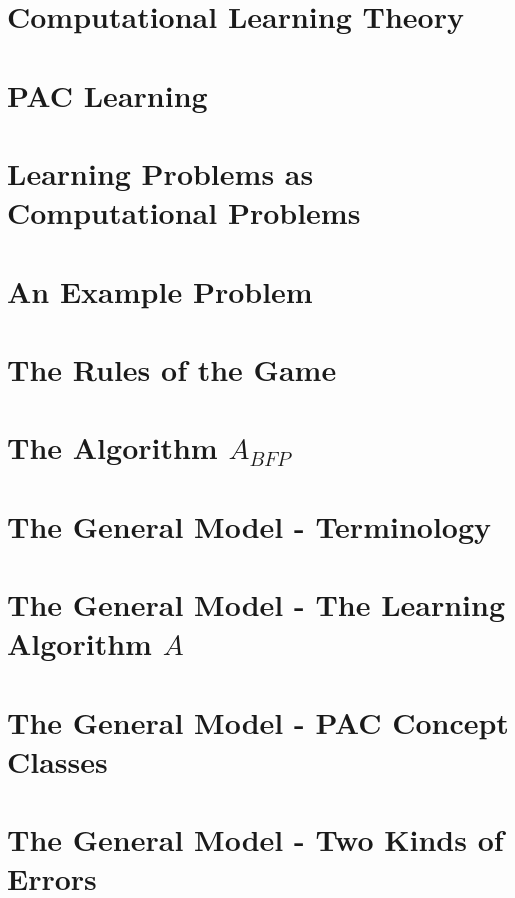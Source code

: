 \documentclass[12pt,a4paper,oneside]{book}
\begin{document}
\section{Computational Learning Theory}

\label{s_5_1}

\section{PAC Learning}

\label{s_5_2}

\section{Learning Problems as Computational Problems}

\label{s_5_3}

\section{An Example Problem}

\label{s_5_4}

\section{The Rules of the Game}

\label{s_5_5}

\section{The Algorithm \texorpdfstring{$A_{BFP}$}{ABFP}}

\label{s_5_6}

\section{The General Model - Terminology}

\label{s_5_7}

\section{The General Model - The Learning Algorithm \texorpdfstring{$A$}{A}}

\label{s_5_8}

\section{The General Model - PAC Concept Classes}

\label{s_5_9}

\section{The General Model - Two Kinds of Errors}

\label{s_5_10}
\end{document}
